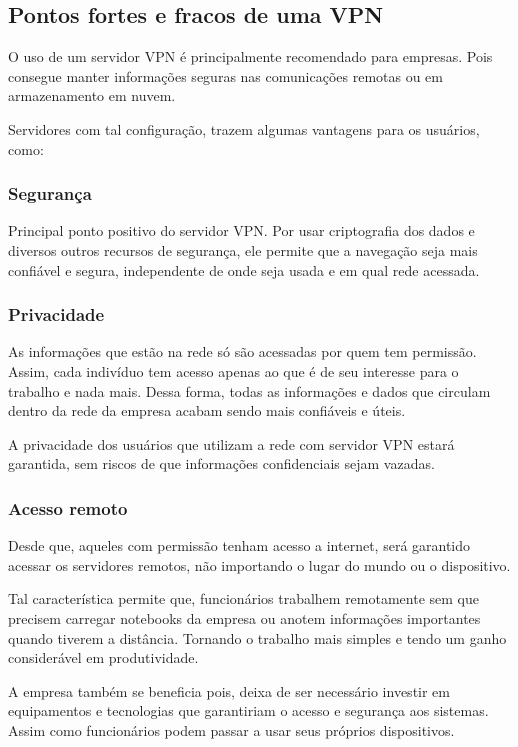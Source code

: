 \documentclass[12pt]{article}
\begin{document}
\subsection{Pontos fortes e fracos de uma VPN}

O uso de um servidor VPN é principalmente recomendado para empresas. Pois consegue manter informações seguras nas comunicações remotas ou em armazenamento em nuvem.

Servidores com tal configuração, trazem algumas vantagens para os usuários, como:

\subsubsection{Segurança}

Principal ponto positivo do servidor VPN.  Por usar criptografia dos dados e diversos outros recursos de segurança, ele permite que a navegação seja mais confiável e segura, independente de onde seja usada e em qual rede acessada.

\subsubsection{Privacidade}
As informações que estão na rede só são acessadas por quem tem permissão. Assim, cada indivíduo tem acesso apenas ao que é de seu interesse para o trabalho e nada mais. Dessa forma, todas as informações e dados que circulam dentro da rede da empresa acabam sendo mais confiáveis e úteis. 

A privacidade dos usuários que utilizam a rede com servidor VPN estará garantida, sem riscos de que informações confidenciais sejam vazadas.

\subsubsection{Acesso remoto}
Desde que, aqueles com permissão tenham acesso a internet, será garantido acessar os servidores remotos, não importando o lugar do mundo ou o dispositivo. 

Tal característica permite que, funcionários trabalhem remotamente sem que precisem carregar notebooks da empresa ou anotem informações importantes quando tiverem a distância. Tornando o trabalho mais simples e tendo um ganho considerável em produtividade.

A empresa também se beneficia pois, deixa de ser necessário investir em equipamentos e tecnologias que garantiriam o acesso e segurança aos sistemas. Assim como funcionários podem passar a usar seus próprios dispositivos.
\end{document}
